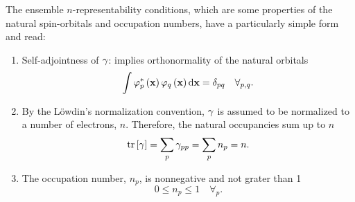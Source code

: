 The ensemble $n$-representability conditions, which are some properties of the 
natural spin-orbitals and occupation numbers, have a particularly simple 
form and read:
\begin{enumerate}
    \item Self-adjointness of $\gamma$: implies orthonormality of the natural orbitals 
        \begin{equation} \label{ec:self-adjoint-condition}
            \int
            \varphi_p^{*} \left( \boldsymbol{\mathrm{x}} \right)
            \varphi_q \left( \boldsymbol{\mathrm{x}} \right)
            \dd{ \boldsymbol{\mathrm{x}}}
            = \delta_{pq}
            \quad \forall_{p,q} 
            .
        \end{equation}
        
    \item By the Löwdin's normalization convention,
        $\gamma$ is assumed to be normalized to a number of electrons, $n$.
        Therefore, the natural occupancies sum up to $n$  
        \begin{equation} \label{ec:normalization-condition}
            \trace \left[ \fordm \right] =
            \sum_{p} \fordm_{pp} =
            \sum_{p} n_p =
            n
            .
        \end{equation}

    \item The occupation number, $n_p$, is nonnegative and not grater than 1 
    \begin{equation} \label{ec:occ-number-condition}
        0 \leq n_p \leq 1 \quad \forall_{p}
        .
    \end{equation}
\end{enumerate}

